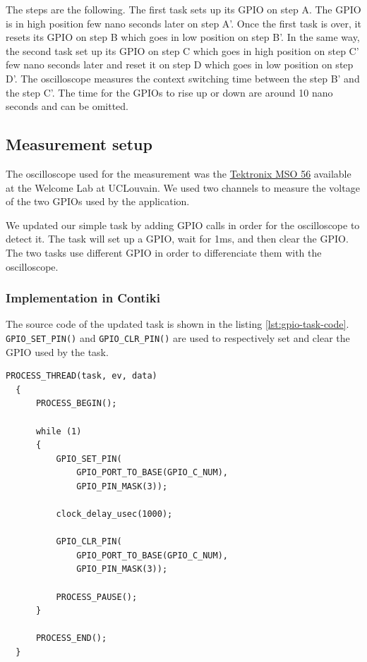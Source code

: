 The steps are the following.
The first task sets up its GPIO on step A.
The GPIO is in high position few nano seconds later on step A'.
Once the first task is over, it resets its GPIO on step B which goes in low position on step B'.
In the same way, the second task set up its GPIO on step C which goes in high position on step C' few nano seconds later and reset it on step D which goes in low position on step D'.
The oscilloscope measures the context switching time between the step B' and the step C'.
The time for the GPIOs to rise up or down are around 10 nano seconds and can be omitted.


\subsection{Measurement setup}

The oscilloscope used for the measurement was the \href{https://www.tek.com/oscilloscope/mso56}{Tektronix MSO 56} available at the Welcome Lab at UCLouvain.
We used two channels to measure the voltage of the two GPIOs used by the application.

We updated our simple task by adding GPIO calls in order for the oscilloscope to detect it.
The task will set up a GPIO, wait for 1ms, and then clear the GPIO.
The two tasks use different GPIO in order to differenciate them with the oscilloscope.

\subsubsection{Implementation in Contiki}
The source code of the updated task is shown in the listing \ref{lst:gpio-task-code}.
\texttt{GPIO\_SET\_PIN()} and \texttt{GPIO\_CLR\_PIN()} are used to respectively set and clear the GPIO used by the task.

\begin{lstlisting}[style=CStyle, float, label={lst:gpio-task-code}, caption={Source code of the task with GPIO calls}]
  PROCESS_THREAD(task, ev, data)
  {
      PROCESS_BEGIN();
  
      while (1)
      {
          GPIO_SET_PIN(
              GPIO_PORT_TO_BASE(GPIO_C_NUM), 
              GPIO_PIN_MASK(3));

          clock_delay_usec(1000);

          GPIO_CLR_PIN(
              GPIO_PORT_TO_BASE(GPIO_C_NUM), 
              GPIO_PIN_MASK(3));

          PROCESS_PAUSE();
      }
  
      PROCESS_END();
  }
\end{lstlisting}

